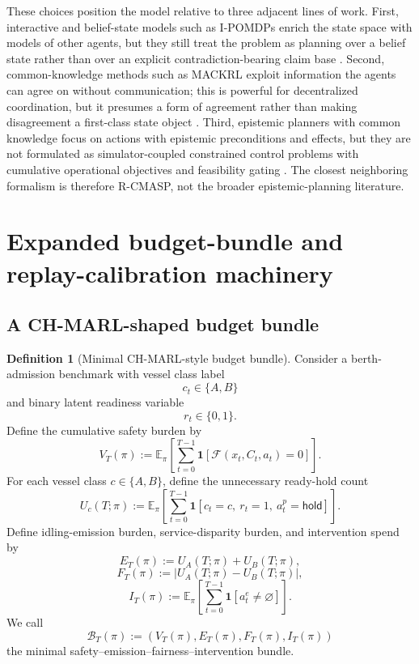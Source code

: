 \documentclass[11pt]{article}
\newcommand{\E}{\mathbb{E}}
\newcommand{\1}{\mathbf{1}}
\theoremstyle{definition}
\newtheorem{definition}{Definition}[section]
\theoremstyle{plain}
\theoremstyle{remark}
\begin{document}
These choices position the model relative to three adjacent lines of work. First, interactive and belief-state models such as I-POMDPs enrich the state space with models of other agents, but they still treat the problem as planning over a belief state rather than over an explicit contradiction-bearing claim base \citep{GmytrasiewiczDoshi2005}. Second, common-knowledge methods such as MACKRL exploit information the agents can agree on without communication; this is powerful for decentralized coordination, but it presumes a form of agreement rather than making disagreement a first-class state object \citep{SchroederdeWitt2019MACKRL}. Third, epistemic planners with common knowledge focus on actions with epistemic preconditions and effects, but they are not formulated as simulator-coupled constrained control problems with cumulative operational objectives and feasibility gating \citep{LiuLiu2018MEP}. The closest neighboring formalism is therefore R-CMASP, not the broader epistemic-planning literature.

\section{Expanded budget-bundle and replay-calibration machinery}
\label{supp:app:expanded-budget-replay}
\subsection{A CH-MARL-shaped budget bundle}
\label{supp:subsec:bundle}

\begin{definition}[Minimal CH-MARL-style budget bundle]
\label{supp:def:bundle}
Consider a berth-admission benchmark with vessel class label
\[
c_t\in\{A,B\}
\]
and binary latent readiness variable
\[
r_t\in\{0,1\}.
\]
Define the cumulative safety burden by
\[
V_T(\pi)
:=
\E_\pi\!\left[\sum_{t=0}^{T-1} \1[\mathcal F(x_t,C_t,a_t)=0]\right].
\]
For each vessel class $c\in\{A,B\}$, define the unnecessary ready-hold count
\[
U_c(T;\pi)
:=
\E_\pi\!\left[\sum_{t=0}^{T-1} \1[c_t=c,\ r_t=1,\ a_t^p=\mathsf{hold}]\right].
\]
Define idling-emission burden, service-disparity burden, and intervention spend by
\[
E_T(\pi):=U_A(T;\pi)+U_B(T;\pi),
\]
\[
F_T(\pi):=\big|U_A(T;\pi)-U_B(T;\pi)\big|,
\]
\[
I_T(\pi)
:=
\E_\pi\!\left[\sum_{t=0}^{T-1} \1[a_t^e\neq \varnothing]\right].
\]
We call
\[
\mathcal B_T(\pi):=(V_T(\pi),E_T(\pi),F_T(\pi),I_T(\pi))
\]
the minimal safety--emission--fairness--intervention bundle.
\end{definition}
\end{document}
